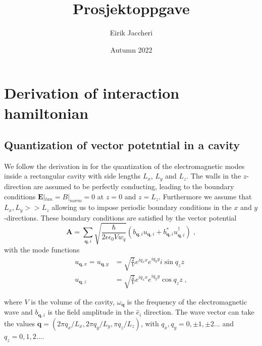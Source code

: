 \documentclass{article}
\title{Prosjektoppgave}
\author{Eirik Jaccheri}
\date{Autumn 2022}
\begin{document}
\maketitle

\section{Derivation of interaction hamiltonian}

\subsection{Quantization of vector potetntial in a cavity}
We follow the derivation in \cite{QuantizationEMCavities} for the quantization of the electromagnetic modes inside a rectangular cavity with side lengths $L_x$, $L_y$ and $L_z$. The walls in the $z$-direction are assumed to be perfectly conducting, leading to the boundary conditions $\textbf{E}|_{tan} = B|_{norm} = 0$ at $z=0$ and $z = L_z$. Furthermore we assume that $L_x, L_y >> L_z$ allowing us to impose periodic boundary conditions in the $x$ and $y$-directions. These boundary conditions are satisfied by the vector potential
\begin{equation}
    \textbf{A} = \sum_{\textbf{q},i} \sqrt{\frac{\hbar}{2 \epsilon \epsilon_0 V w_q}} \left(b_{\textbf{q}, i} u_{\textbf{q},i} + b_{\textbf{q}, i}^{*} u_{\textbf{q},i}^{\dagger}\right)\;,
    \label{classical vector potential}
\end{equation}
with the mode functions
\begin{align}
    u_{\textbf{q}, x} = u_{\textbf{q}, y} &= \sqrt{\frac{2}{V}} e^{iq_x x} e^{iq_y y} i \sin{q_z z}\nonumber\\
                     u_{\textbf{q}, z} &= \sqrt{\frac{2}{V}} e^{iq_x x} e^{iq_y y} \cos{q_z z} \label{mode functions}\;,
\end{align}

where $V$ is the volume of the cavity, $\omega_{\textbf{q}}$ is the frequency of the electromagnetic wave and $b_{\textbf{q}, i}$ is the field amplitude in the $\hat{e}_i$ direction. The wave vector can take the values $\textbf{q} = (2\pi q_x / L_x, 2\pi q_y / L_y, \pi q_z / L_z )$, with $q_x, q_y = 0, \pm 1, \pm 2...$ and $q_z = 0, 1, 2...$. 
\end{document}
